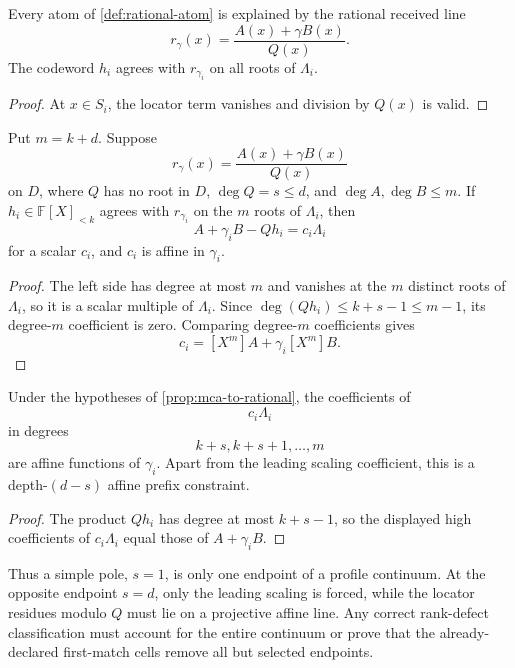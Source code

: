 \documentclass[11pt,a4paper]{amsart}
\numberwithin{equation}{section}
\theoremstyle{remark}
\newcommand{\F}{\mathbb F}\newcommand{\B}{\mathbb B}\newcommand{\K}{\mathbb K}\newcommand{\Z}{\mathbb Z}
\begin{document}
\begin{proposition}\label{prop:rational-to-mca}
Every atom of \cref{def:rational-atom} is explained by the rational received line
\[
 r_\gamma(x)=\frac{A(x)+\gamma B(x)}{Q(x)}.
\]
The codeword $h_i$ agrees with $r_{\gamma_i}$ on all roots of $\Lambda_i$.
\end{proposition}

\begin{proof}
At $x\in S_i$, the locator term vanishes and division by $Q(x)$ is valid.
\end{proof}

\begin{proposition}\label{prop:mca-to-rational}
Put $m=k+d$.  Suppose
\[
 r_\gamma(x)=\frac{A(x)+\gamma B(x)}{Q(x)}
\]
on $D$, where $Q$ has no root in $D$, $\deg Q=s\le d$, and $\deg A,\deg B\le m$.  If $h_i\in\F[X]_{<k}$ agrees with $r_{\gamma_i}$ on the $m$ roots of $\Lambda_i$, then
\[
 A+\gamma_iB-Qh_i=c_i\Lambda_i
\]
for a scalar $c_i$, and $c_i$ is affine in $\gamma_i$.
\end{proposition}

\begin{proof}
The left side has degree at most $m$ and vanishes at the $m$ distinct roots of $\Lambda_i$, so it is a scalar multiple of $\Lambda_i$.  Since $\deg(Qh_i)\le k+s-1\le m-1$, its degree-$m$ coefficient is zero.  Comparing degree-$m$ coefficients gives
\[
 c_i=[X^m]A+\gamma_i[X^m]B.
\]
\end{proof}

\begin{corollary}\label{cor:profile-depth}
Under the hypotheses of \cref{prop:mca-to-rational}, the coefficients of
\[
 c_i\Lambda_i
\]
in degrees
\[
 k+s,k+s+1,\ldots,m
\]
are affine functions of $\gamma_i$.  Apart from the leading scaling coefficient, this is a depth-$(d-s)$ affine prefix constraint.
\end{corollary}

\begin{proof}
The product $Qh_i$ has degree at most $k+s-1$, so the displayed high coefficients of $c_i\Lambda_i$ equal those of $A+\gamma_iB$.
\end{proof}

Thus a simple pole, $s=1$, is only one endpoint of a profile continuum.  At the opposite endpoint $s=d$, only the leading scaling is forced, while the locator residues modulo $Q$ must lie on a projective affine line.  Any correct rank-defect classification must account for the entire continuum or prove that the already-declared first-match cells remove all but selected endpoints.
\end{document}
